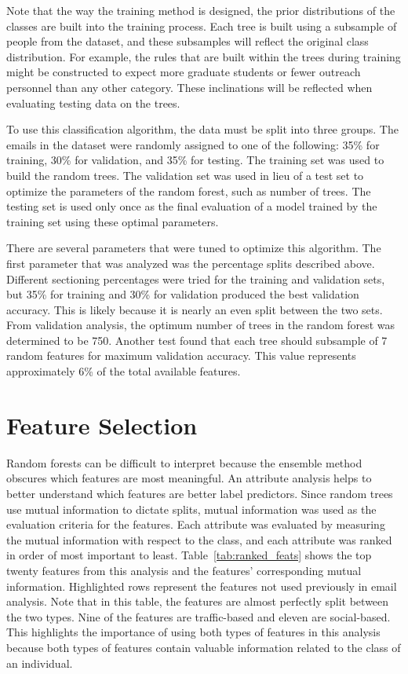 \documentclass[12pt]{report}
\begin{document}
Note that the way the training method is designed, the prior distributions of the classes are built into the training process.
Each tree is built using a subsample of people from the dataset, and these subsamples will reflect the original class distribution.
For example, the rules that are built within the trees during training might be constructed to expect more graduate students or fewer outreach personnel than any other category.
These inclinations will be reflected when evaluating testing data on the trees.

To use this classification algorithm, the data must be split into three groups.
The emails in the dataset were randomly assigned to one of the following: 35\% for training, 30\% for validation, and 35\% for testing.
The training set was used to build the random trees.
The validation set was used in lieu of a test set to optimize the parameters of the random forest, such as number of trees.
The testing set is used only once as the final evaluation of a model trained by the training set using these optimal parameters.

There are several parameters that were tuned to optimize this algorithm.
The first parameter that was analyzed was the percentage splits described above. 
Different sectioning percentages were tried for the training and validation sets, but 35\% for training and 30\% for validation produced the best validation accuracy.
This is likely because it is nearly an even split between the two sets.
From validation analysis, the optimum number of trees in the random forest was determined to be 750.
Another test found that each tree should subsample of 7 random features for maximum validation accuracy.
This value represents approximately 6\% of the total available features.



\section{Feature Selection} \label{ssec:feature_select}
Random forests can be difficult to interpret because the ensemble method obscures which features are most meaningful.
An attribute analysis helps to better understand which features are better label predictors.
Since random trees use mutual information to dictate splits, mutual information was used as the evaluation criteria for the features.
Each attribute was evaluated by measuring the mutual information with respect to the class, and each attribute was ranked in order of most important to least.
Table~\ref{tab:ranked_feats} shows the top twenty features from this analysis and the features' corresponding mutual information.  
Highlighted rows represent the features not used previously in email analysis.
Note that in this table, the features are almost perfectly split between the two types.
Nine of the features are traffic-based and eleven are social-based.
This highlights the importance of using both types of features in this analysis because both types of features contain valuable information related to the class of an individual.
\end{document}
